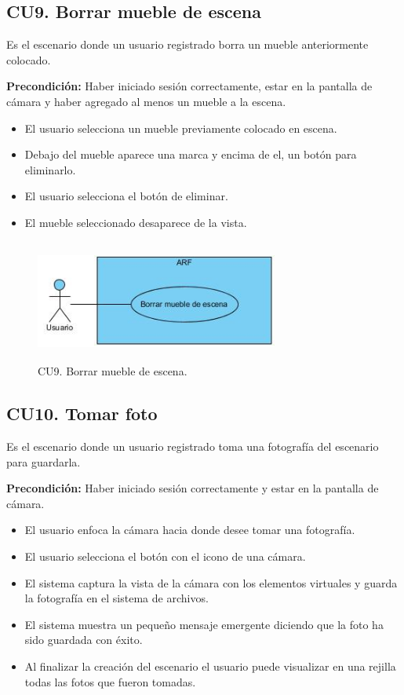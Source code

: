 \subsection{CU9. Borrar mueble de escena}\par
Es el escenario donde un usuario registrado borra un mueble anteriormente colocado.\par
\textbf{Precondición:} Haber iniciado sesión correctamente, estar en la pantalla de cámara y haber agregado al menos un mueble a la escena.\par
\begin{itemize}
	\item El usuario selecciona un mueble previamente colocado en escena.
	\item Debajo del mueble aparece una marca y encima de el, un botón para eliminarlo.
	\item El usuario selecciona el botón de eliminar.
	\item El mueble seleccionado desaparece de la vista.
\end{itemize}

\begin{figure}[!htbp]
	\centering
	\includegraphics[width=8cm,height=4cm]{imagenes/analisis/cu/borrar_mueble.jpg}
	\caption{CU9. Borrar mueble de escena.}
	\label{fig:borrarmueble}
\end{figure}
\subsection{CU10. Tomar foto}\par
Es el escenario donde un usuario registrado toma una fotografía del escenario para guardarla.\par
\textbf{Precondición:} Haber iniciado sesión correctamente y estar en la pantalla de cámara.\par
\begin{itemize}
	\item El usuario enfoca la cámara hacia donde desee tomar una fotografía.
	\item El usuario selecciona el botón con el icono de una cámara.
	\item El sistema captura la vista de la cámara con los elementos virtuales y guarda la fotografía en el sistema de archivos.
	\item El sistema muestra un pequeño mensaje emergente diciendo que la foto ha sido guardada con éxito.
	\item Al finalizar la creación del escenario el usuario puede visualizar en una rejilla todas las fotos que fueron tomadas.
\end{itemize}


